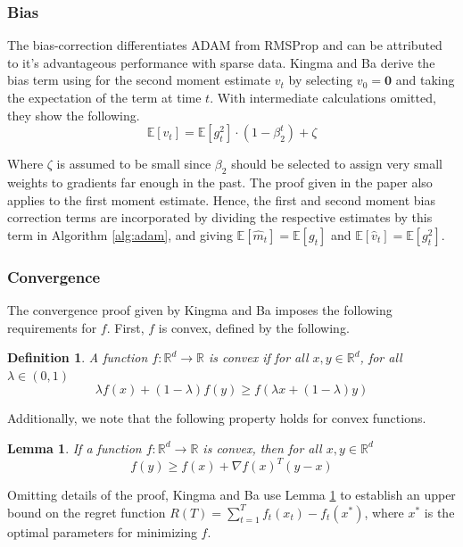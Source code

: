 \documentclass[letterpaper,11 pt]{article}
\newtheorem{lemma}{Lemma}
\newtheorem{definition}{Definition}
\begin{document}
\subsubsection{Bias}

The bias-correction differentiates ADAM from RMSProp and can be attributed to it's advantageous performance with sparse data. Kingma and Ba derive the bias term using for the second moment estimate $v_{t}$ by selecting $v_{0}=\textbf{0}$ and taking the expectation of the term at time $t$. With intermediate calculations omitted, they show the following.
\[
\mathbb{E}[v_{t}]=\mathbb{E}[g_{t}^{2}]\cdot(1-\beta_{2}^{t})+\zeta
\]

Where $\zeta$ is assumed to be small since $\beta_{2}$ should be selected to assign very small weights to gradients far enough in the past.  The proof given in the paper also applies to the first moment estimate.  Hence, the first  and second moment bias correction terms are incorporated by dividing the respective estimates by this term in Algorithm \ref{alg:adam}, and giving  $\mathbb{E}[\hat{m}_{t}]=\mathbb{E}[g_{t}]$ and $\mathbb{E}[\hat{v}_{t}]=\mathbb{E}[g_{t}^{2}]$. \cite{kingma}

\subsubsection{Convergence}

The convergence proof given by Kingma and Ba imposes the following requirements for $f$.  First, $f$ is convex, defined by the following.

\begin{definition}\label{def:convex}
A function $f:\mathbb{R}^{d}\rightarrow \mathbb{R}$ is convex if for all $x,y\in \mathbb{R}^{d}$, for all $\lambda \in (0,1)$
\[
\lambda f(x) + (1-\lambda)f(y) \geq f(\lambda x + (1-\lambda)y)
\]
\end{definition}
Additionally, we note that the following property holds for convex functions.
\begin{lemma}\label{lemma:convex}
If a function $f:\mathbb{R}^{d}\rightarrow \mathbb{R}$ is convex, then for all $x,y\in \mathbb{R}^{d}$
\[
f(y) \geq f(x) + \nabla f(x)^{T} (y-x)
\]
\end{lemma}

Omitting details of the proof, Kingma and Ba use Lemma \ref{lemma:convex} to establish an upper bound on the regret function $R(T) = \sum_{t=1}^{T}{f_{t}(x_{t}) - f_{t}(x^{*}) }$, where $x^{*}$ is the optimal parameters for minimizing $f$. 
\end{document}
